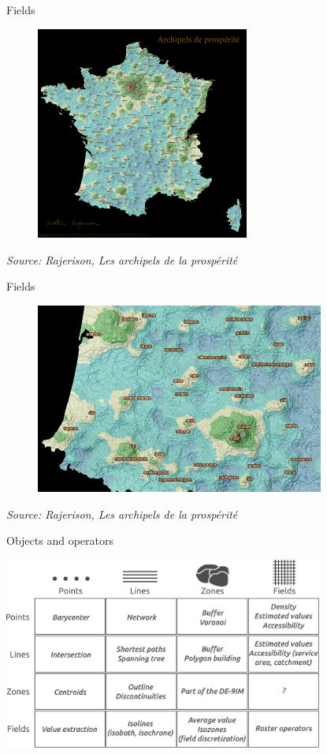 \begin{frame}{Fields}

\begin{figure}
\includegraphics[width=7cm]{Rajerison_Revenu.jpg}
\end{figure}

\footnotesize
\textit{Source: Rajerison, Les archipels de la prospérité}
\normalsize

\end{frame}



\begin{frame}{Fields}

\begin{figure}
\includegraphics[width=9.5cm]{Rajerison_Zoom.jpg}
\end{figure}

\footnotesize
\textit{Source: Rajerison, Les archipels de la prospérité}
\normalsize
\end{frame}



\begin{frame}{Objects and operators}
\begin{center}
\includegraphics[width=10.5cm]{TypesObjets.pdf}
\end{center}
\end{frame}


